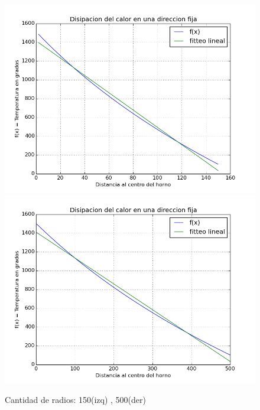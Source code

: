\begin{figure}[h]
\centering
\includegraphics[scale=0.34]{funcion_temp_150_radios_ti_1500_te_102.png}
\includegraphics[scale=0.34]{funcion_temp_500_radios_ti_1500_te_102.png}
\caption{Cantidad de radios: 150(izq) , 500(der)}
\end{figure}